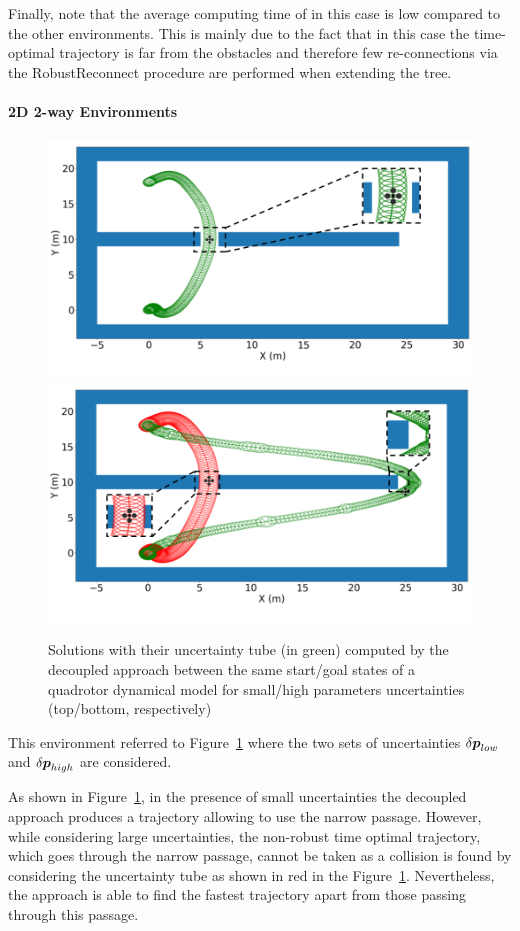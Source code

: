 Finally, note that the average computing time of  in this case is low compared to the other environments. 
This is mainly due to the fact that in this case the time-optimal trajectory is far from the obstacles and therefore few re-connections via the  RobustReconnect procedure are performed when extending the tree.

\paragraph{2D 2-way Environments} 

\begin{figure}[h]
    \centering
    \includegraphics[width=0.7\linewidth]{figures/samp/Contribution-example1.png}
    \includegraphics[width=0.7\linewidth]{figures/samp/Contribution-example2.png}
    \caption{Solutions with their uncertainty tube (in green) computed by the decoupled approach between the same start/goal states of a quadrotor dynamical model for small/high parameters uncertainties (top/bottom, respectively)}
    \label{fig:2way}
\end{figure}

This environment referred to Figure~\ref{fig:2way} where the two sets of uncertainties $\delta\boldsymbol{p}_{low}$ and $\delta\boldsymbol{p}_{high}$ are considered.

As shown in Figure~\ref{fig:2way}, in the presence of small uncertainties the decoupled approach produces a trajectory allowing to use the narrow passage. 
However, while considering large uncertainties, the non-robust time optimal trajectory, which goes through the narrow passage, cannot be taken as a collision is found by considering the uncertainty tube as shown in red in the Figure~\ref{fig:2way}.
Nevertheless, the approach is able to find the fastest trajectory apart from those passing through this passage.

